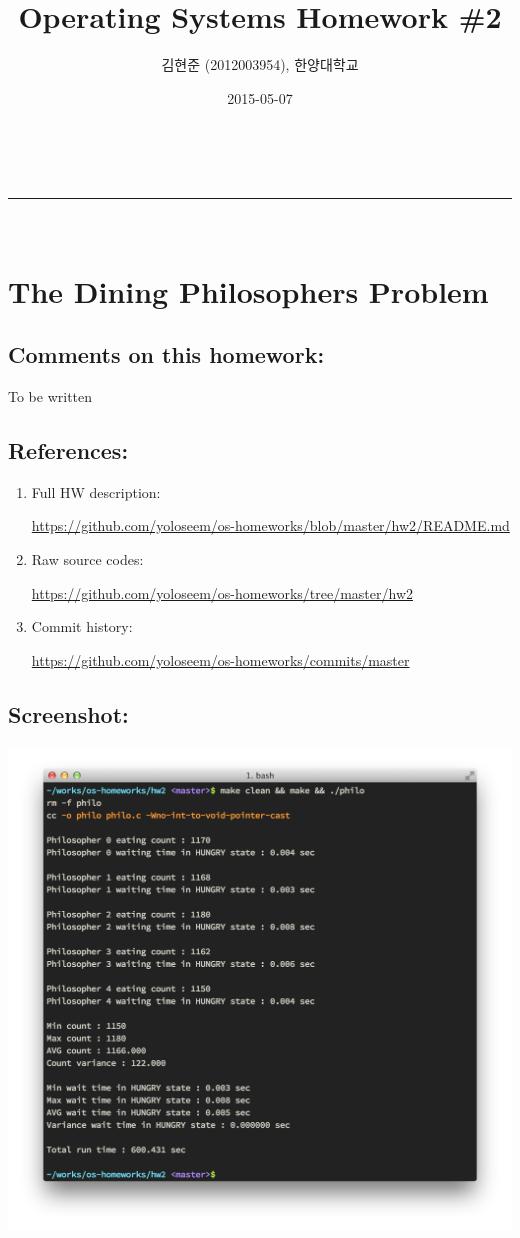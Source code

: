 \documentclass[a4paper,11pt]{article}
\makeatletter
\newcommand{\linia}{\rule{\linewidth}{0.5pt}}
\renewcommand{\maketitle}{
\begin{center}
\vspace{2ex}
{\huge \textsc{\@title}}
\vspace{1ex}
\\
\linia\\
\@author \hfill \@date
\vspace{4ex}
\end{center}
}
\makeatother
\begin{document}
\title{Operating Systems Homework \#2}

\author{김현준 (2012003954), 한양대학교}

\date{2015-05-07}

\maketitle

\section*{The Dining Philosophers Problem}

\subsection*{Comments on this homework:}
    To be written

\subsection*{References:}
\begin{enumerate}
\item
    Full HW description:

        \url{https://github.com/yoloseem/os-homeworks/blob/master/hw2/README.md}

\item
    Raw source codes:

        \url{https://github.com/yoloseem/os-homeworks/tree/master/hw2}

\item
    Commit history:

        \url{https://github.com/yoloseem/os-homeworks/commits/master}
\end{enumerate}

\subsection*{Screenshot:}
    \includegraphics[width=\textwidth]{screenshot.png}
\end{document}
